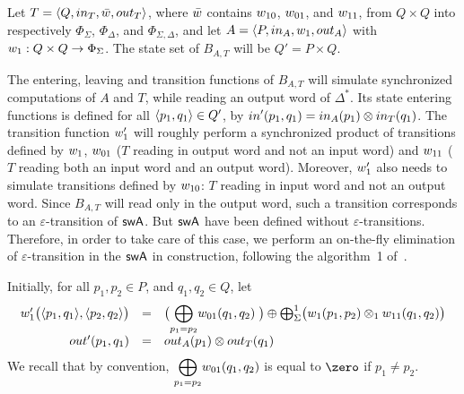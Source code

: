 %
%
Let $T = \< Q, \init_T, \bar{\wei}, \final_T >$,
where $\bar{\wei}$ contains $\wei_{10}$, $\wei_{01}$, and $\wei_{11}$,
from $Q \times Q$ into respectively
$\Phi_{\Sigma}$, $\Phi_{\Delta}$, and $\Phi_{\Sigma, \Delta}$,
and let $A = \< P, \init_A, \wei_1, \final_A >$
with $\wei_1: Q \times Q \to \Phi_{\Sigma}$.
The state set of $B_{A, T}$ will be $Q' = P \times Q$.

The entering, leaving and transition functions of $B_{A, T}$ will
simulate synchronized computations of $A$ and $T$,
while reading an output word of $\Delta^*$.
%
Its state entering functions is defined
for all $\<p_1, q_1> \in Q'$, %
by $\init'(p_1, q_1) = \init_A(p_1) \otimes \init_T(q_1)$.
%
The transition function $\wei'_1$ will roughly perform
a synchronized product of transitions defined by $\wei_1$,
$\wei_{01}$ ($T$ reading in output word and not an input word)
and $\wei_{11}$ ($T$ reading both an input word and an output word).
%
Moreover, $\wei'_1$ also needs to simulate transitions
defined by $\wei_{10}$: $T$ reading in input word and not an output word.
Since $B_{A, T}$  will read only in the output word, such a transition corresponds
to an $\varepsilon$-transition of $\textsf{swA}$.
But $\textsf{swA}$ have been defined without $\varepsilon$-transitions.
Therefore, in order to take care of this case, we perform an on-the-fly
elimination of $\varepsilon$-transition in the $\textsf{swA}$ in construction,
following the algorithm~1 of~\cite{LombardySakarovitch12ciaa}.
%


\noindent
Initially, for all $p_1, p_2 \in P$, and $q_1, q_2 \in Q$, let
\[
\begin{array}{rcl}
\wei'_1\bigl( \< p_1, q_1>, \< p_2, q_2>\bigr) & = &
\bigl({\displaystyle\bigoplus_{p_1 = p_2}} \wei_{01}(q_1, q_2)\;\bigr)
\oplus
\bigoplus^1_\Sigma \bigl(\wei_1(p_1, p_2) \otimes_1 \wei_{11}(q_1, q_2)\bigr)\\
%
\final'(p_1, q_1) & = & \final_A(p_1) \otimes \final_T(q_1)
\end{array}
\]
We recall that by convention, 
${\displaystyle\bigoplus_{p_1 = p_2}} \wei_{01}(q_1, q_2)$
is equal to $\zero$ if $p_1 \neq p_2$.


